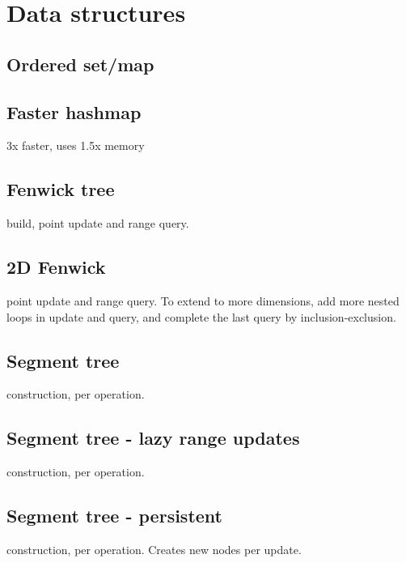 \section{Data structures}

\subsection{Ordered set/map}


\subsection{Faster hashmap}
3x faster, uses 1.5x memory


\subsection{Fenwick tree}
 build,  point update and range query.


\subsection{2D Fenwick}
 point update and range query.
To extend to more dimensions, add more nested loops in update
and query, and complete the last query by inclusion-exclusion.



\subsection{Segment tree}
 construction,  per operation.


\subsection{Segment tree - lazy range updates}
 construction,  per operation.


\subsection{Segment tree - persistent}
 construction,  per operation.
Creates  new nodes per update.


